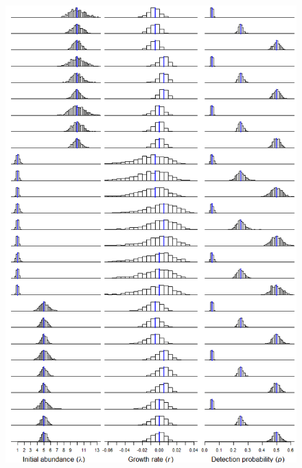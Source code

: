 \documentclass[12pt,english]{article}
\begin{document}
\begin{spacing}{1.9}
\begin{flushleft}
\begin{figure}
\caption{}
  \centering
  \includegraphics[height=8in]{figs/exp_hists}
\label{fig:exp_hists}
\end{figure}


\end{flushleft}
\end{spacing}
\end{document}
